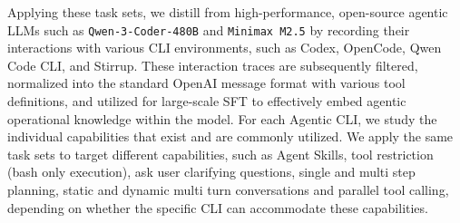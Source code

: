 Applying these task sets, we distill from high-performance, open-source agentic LLMs such as \texttt{Qwen-3-Coder-480B} \citep{qwen2025qwen25technicalreport} and \texttt{Minimax M2.5} \citep{minimax2025m2} by recording their interactions with various CLI environments, such as Codex, OpenCode, Qwen Code CLI, and Stirrup. These interaction traces are subsequently filtered, normalized into the standard OpenAI message format with various tool definitions, and utilized for large-scale SFT to effectively embed agentic operational knowledge within the model. For each Agentic CLI, we study the individual capabilities that exist and are commonly utilized. We apply the same task sets to target different capabilities, such as Agent Skills, tool restriction (bash only execution), ask user clarifying questions, single and multi step planning, static and dynamic multi turn conversations and parallel tool calling, depending on whether the specific CLI can accommodate these capabilities. 

